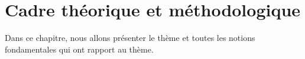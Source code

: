 \documentclass[a4paper,12pt,french]{report} %
\begin{document}
\chapter{Cadre théorique et méthodologique}
	Dans ce chapitre, nous allons présenter le thème et toutes les notions fondamentales qui ont rapport au thème.

\end{document}
